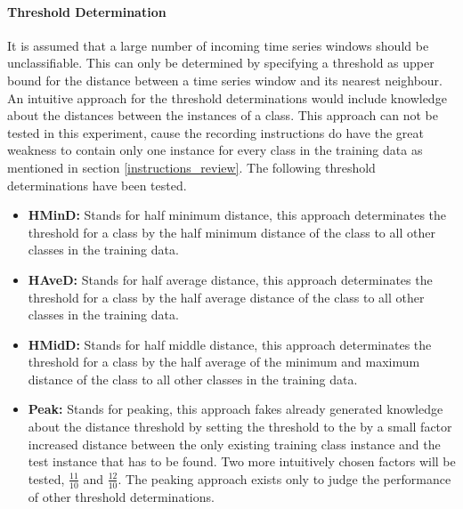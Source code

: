 \paragraph{Threshold Determination} \label{threshold_determination}
It is assumed that a large number of incoming time series windows should be unclassifiable. This can only be determined
by specifying a threshold as upper bound for the distance between a time series window and its nearest neighbour. An
intuitive approach for the threshold determinations would include knowledge about the distances between the instances of
a class. This approach can not be tested in this experiment, cause the recording instructions do have the great weakness
to contain only one instance for every class in the training data as mentioned in section \ref{instructions_review}. The
following threshold determinations have been tested.

\begin{itemize}
    \item \textbf{HMinD:} Stands for half minimum distance, this approach determinates the threshold for a class by the
        half minimum distance of the class to all other classes in the training data.
    \item \textbf{HAveD:} Stands for half average distance, this approach determinates the threshold for a class by the
        half average distance of the class to all other classes in the training data.
    \item \textbf{HMidD:} Stands for half middle distance, this approach determinates the threshold for a class by the
        half average of the minimum and maximum distance of the class to all other classes in the training data.
    \item \textbf{Peak:} Stands for peaking, this approach fakes already generated knowledge about the distance
        threshold by setting the threshold to the by a small factor increased distance between the only existing
        training class instance and the test instance that has to be found. Two more intuitively chosen factors will be
        tested, $\frac{11}{10}$ and $\frac{12}{10}$. The peaking approach exists only to judge the performance of other
        threshold determinations.
\end{itemize}
